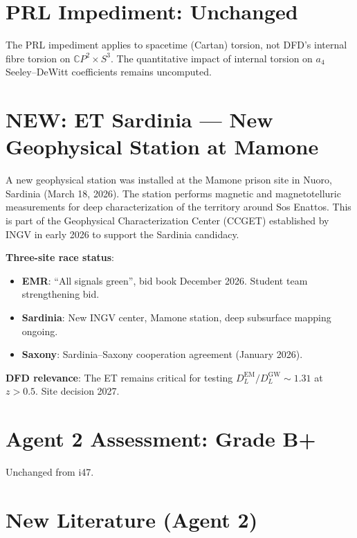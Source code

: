 \documentclass[11pt,a4paper]{article}
\newcommand{\NEW}{\textcolor{dfdblue}{\textbf{NEW}}}
\newcommand{\CP}{\mathbb{C}P}
\begin{document}
\section{PRL Impediment: Unchanged}

The PRL impediment applies to spacetime (Cartan) torsion, not DFD's internal fibre torsion on $\CP^2 \times S^3$. The quantitative impact of internal torsion on $a_4$ Seeley--DeWitt coefficients remains uncomputed.

\section{\NEW: ET Sardinia --- New Geophysical Station at Mamone}

\begin{tcolorbox}[colback=blue!5!white, colframe=blue!60!black,
  title={\NEW: Sardinia ET Site Characterization Deepens (March 2026)}]

A new geophysical station was installed at the Mamone prison site in Nuoro, Sardinia (March 18, 2026). The station performs magnetic and magnetotelluric measurements for deep characterization of the territory around Sos Enattos. This is part of the Geophysical Characterization Center (CCGET) established by INGV in early 2026 to support the Sardinia candidacy.

\textbf{Three-site race status}:
\begin{itemize}
\item \textbf{EMR}: ``All signals green'', bid book December 2026. Student team strengthening bid.
\item \textbf{Sardinia}: New INGV center, Mamone station, deep subsurface mapping ongoing.
\item \textbf{Saxony}: Sardinia--Saxony cooperation agreement (January 2026).
\end{itemize}

\textbf{DFD relevance}: The ET remains critical for testing $D_L^{\text{EM}}/D_L^{\text{GW}} \sim 1.31$ at $z > 0.5$. Site decision 2027.
\end{tcolorbox}

\section{Agent 2 Assessment: Grade B+}

Unchanged from i47.

\section{New Literature (Agent 2)}
\end{document}
